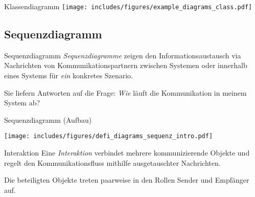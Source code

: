 \begin{example}{Klassendiagramm}
    \texttt{[image: includes/figures/example\_diagrams\_class.pdf]}
\end{example}

\subsection{Sequenzdiagramm}

\begin{defi}{Sequenzdiagramm}
    \emph{Sequenzdiagramme} zeigen den Informationsaustausch via Nachrichten von Kommunikationspartnern zwischen Systemen oder innerhalb eines Systems für \emph{ein} konkretes Szenario.

    Sie liefern Antworten auf die Frage:
    \emph{Wie} läuft die Kommunikation in meinem System ab?
\end{defi}

\begin{diag}{Sequenzdiagramm (Aufbau)}
    \begin{center}
        \texttt{[image: includes/figures/defi\_diagrams\_sequenz\_intro.pdf]}
    \end{center}
\end{diag}

\begin{diag}{Interaktion}
    Eine \emph{Interaktion} verbindet mehrere kommunizierende Objekte und regelt den Kommunikationsfluss mithilfe ausgetauschter Nachrichten.

    Die beteiligten Objekte treten paarweise in den Rollen Sender und Empfänger auf.
\end{diag}

